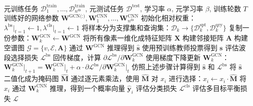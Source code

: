 \renewcommand{\algorithmicrequire}{\textbf{输入:}}
\renewcommand{\algorithmicensure}{\textbf{输出:}}
\begin{algorithm}
\begin{algorithmic}
\Require
元训练任务 $\mathcal{D}_1^\text{train}, \dots, \mathcal{D}_{n^\text{ds}}^\text{train}$,
元测试任务 $\mathcal{D}^\text{test}$,
学习率 $\alpha$,
元学习率 $\beta$,
训练轮数 $T$
\Ensure
训练好的网络参数 $\mathbf{W}^\text{GCN(:)}, \mathbf{W}^\text{CNN}_1, \dots, \mathbf{W}^\text{CNN}_{n^\text{ds}}$
\State 初始化相对权重：$\lambda^\text{bs}\vert_{t=1} \leftarrow 1, \lambda^\text{cls}\vert_{t=1} \leftarrow 1$
        \State 将样本分为支撑集和查询集：$\mathcal{D}_k \rightarrow \{ \mathcal{D}^\text{spt}_k, \mathcal{D}^\text{qry}_k \}$ %
        \State 复制一份参数：$\mathbf{W}^\text{GCN}_k \leftarrow \mathbf{W}^\text{GCN}$ %
            \State 将所有像素一维化成特征矩阵 $\mathbf{X}$
            \State 构建邻接矩阵 $\mathbf{A}$
            \State 构建空谱图 $\mathcal{G} = \{ v, \mathcal{E}, \mathbf{A} \}$
            \State 通过 $\mathbf{W}^\text{GCN}$ 推理得到 $\hat{\mathbf{s}}$ 
            \State 使用预训练教师投票得到 $\mathbf{s}$
            \State 评估波段选择损失 $\mathcal{L}^\text{bs}$
            \State 回传梯度，计算 $\partial{\mathcal{L}^\text{bs}}/\partial{\mathbf{W}_k^\text{GCN}}$
            \State 使用梯度下降更新 $\mathbf{W}^\text{GCN}_k$：\\
            $\mathbf{W}^\text{GCN}_k\vert_{t+1} = \mathbf{W}^\text{GCN}_k\vert_t + \alpha \cdot \partial{\mathcal{L}^\text{bs}}/\partial{\mathbf{W}^\text{GCN}_k\vert_t}$
        \EndFor
            \State 仿照上述步骤计算得到 $\hat{\mathbf{s}}$ 和 $\mathcal{L}^\text{bs}$
            \State 将 $\hat{\mathbf{s}}$ 二值化成为掩码图 $\hat{\mathbf{M}}$
                \State 通过逐元素乘法，使用 $\hat{\mathbf{M}}$ 对 $x_i$ 进行选择：$x_i \leftarrow x_i \cdot \hat{\mathbf{M}}$
                \State 将 $x_i$ 通过 $\mathbf{W}^\text{CNN}_k$ 推理，得到一个概率向量 $\hat{\mathbf{y}}_i$
            \EndFor
            \State 评估分类损失 $\mathcal{L}^\text{cls}$
            \State 评估多目标平衡损失 $\mathcal{L}$

\end{algorithmic}
\end{algorithm}
